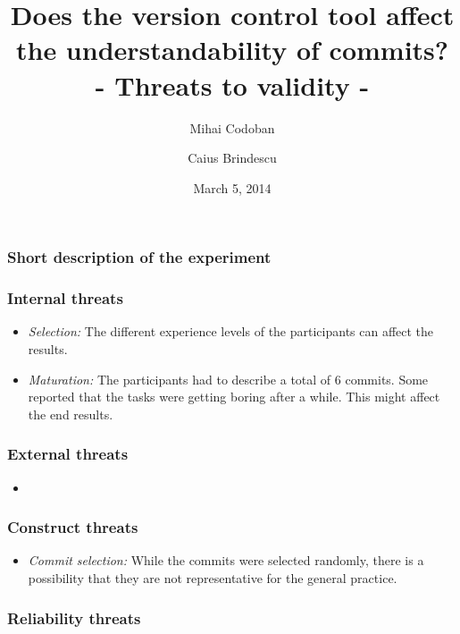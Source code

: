 \documentclass{beamer}
\title{Does the version control tool affect the understandability of commits? \\ - Threats to validity - }
\author{Mihai Codoban \and Caius Brindescu}
\date{March 5, 2014}
\begin{document}
\begin{frame}
\titlepage
\end{frame}

\begin{frame}
\frametitle{Short description of the experiment}
\end{frame}

\begin{frame}
\end{frame}

\begin{frame}
\frametitle{Internal threats}
\begin{itemize}
	\item{\emph{Selection:}} The different experience levels of the participants can affect the results.
	\item{\emph{Maturation:}} The participants had to describe a total of 6 commits. 
	Some reported that the tasks were getting boring after a while.
	This might affect the end results.
\end{itemize}
\end{frame}

\begin{frame}
\frametitle{External threats}
\begin{itemize}
	\item{\emph{}}
\end{itemize}
\end{frame}

\begin{frame}
\frametitle{Construct threats}
\begin{itemize}
	\item{\emph{Commit selection:}} While the commits were selected randomly, there is a possibility that they are not representative for the general practice. 
\end{itemize}
\end{frame}

\begin{frame}
\frametitle{Reliability threats}
\end{frame}
\end{document}
